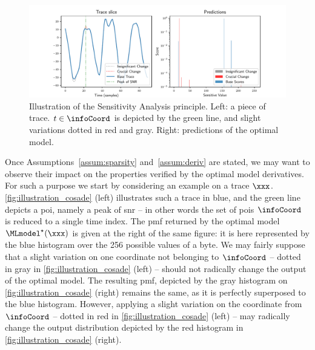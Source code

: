 \begin{figure}
	\centering
	\includegraphics[width=\textwidth]{figures/Illustrations/optimal_model_illustration_review_backup.pdf}
	\caption{Illustration of the Sensitivity Analysis principle. 
	Left: a piece of trace. \(t \in \infoCoord\) is depicted by the green line, and slight variations dotted in red and gray.
	Right: predictions of the optimal model.}
	\label{fig:illustration_cosade}
\end{figure}
Once Assumptions~\ref{assum:sparsity} and~\ref{assum:deriv} are stated, we may want to observe their impact on the properties verified by the optimal model derivatives.
For such a purpose we start by considering an example on a trace \(\xxx\).
\autoref{fig:illustration_cosade} (left) illustrates such a trace in blue, and the green line depicts a \gls{poi}, namely a peak of \gls{snr} -- in other words the set of \glspl{poi} \(\infoCoord\) is reduced to a single time index. 
The \gls{pmf} returned by the optimal model \(\MLmodel^\star(\xxx)\) is given at the right of the same figure: it is here represented by the blue histogram over the 256 possible values of a byte.
We may fairly suppose that a slight variation on one coordinate not belonging to \(\infoCoord\) -- dotted in gray in \autoref{fig:illustration_cosade} (left) -- should not radically change the output of the optimal model. 
The resulting \gls{pmf}, depicted by the gray histogram on \autoref{fig:illustration_cosade} (right) remains the same, as it is perfectly superposed to the blue histogram.
However, applying a slight variation on the coordinate from \(\infoCoord\) -- dotted in red in \autoref{fig:illustration_cosade} (left) -- may radically change the output distribution depicted by the red histogram in \autoref{fig:illustration_cosade} (right).


